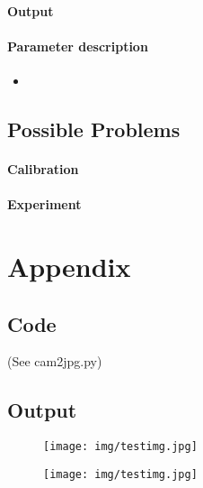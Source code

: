\documentclass{scrartcl}
\begin{document}
\paragraph{Output}

\paragraph{Parameter description}
\begin{itemize}
\item
\end{itemize}


\subsection{Possible Problems}
\paragraph{Calibration}

\paragraph{Experiment}



\section{Appendix}


\subsection{Code}
(See cam2jpg.py)


\subsection{Output}

\begin{figure}[H]
\centering
\begin{minipage}{.5\textwidth}
  \centering
  \texttt{[image: img/testimg.jpg]}
\end{minipage}%
\begin{minipage}{.5\textwidth}
  \centering
  \texttt{[image: img/testimg.jpg]}
\end{minipage}
\end{figure}
\end{document}
